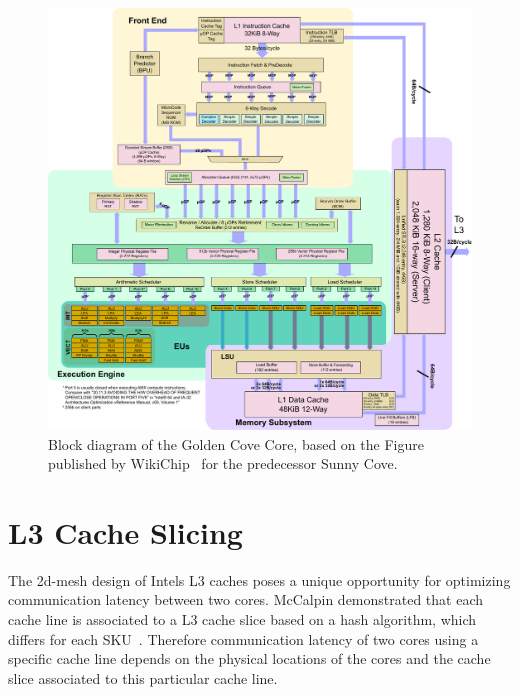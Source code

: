 \begin{figure}[]
    \centering
    \includegraphics[width=\columnwidth]{fig/GoldenCoveCore.pdf}
    \caption{\label{fig:golden-cove}Block diagram of the Golden Cove Core, based on the Figure published by WikiChip~\cite{Wikichip_SunnyCoveDiagram} for the predecessor Sunny Cove.}
\end{figure}

\clearpage

\section{L3 Cache Slicing}
\label{sec:l3_cache_slicing}

The 2d-mesh design of Intels L3 caches poses a unique opportunity for optimizing communication latency between two cores.
McCalpin demonstrated that each cache line is associated to a L3 cache slice based on a hash algorithm, which differs for each SKU~\cite{McCalpin_2018_IntelAddressHashing}.
Therefore communication latency of two cores using a specific cache line depends on the physical locations of the cores and the cache slice associated to this particular cache line.

